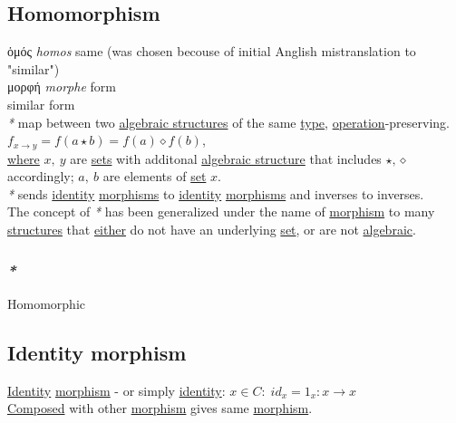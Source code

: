 \documentclass[a4paper,14pt,oneside]{book}
\begin{document}
{\subsection{\label{org203620e}Homomorphism}
\label{sec:orga778f43}
ὁμός \emph{homos} same (was chosen becouse of initial Anglish mistranslation to "similar")\\
μορφή \emph{morphe} form\\
similar form\\

\emph{*} map between two \hyperref[org344f79b]{algebraic structures} of the same \hyperref[orga9ca243]{type}, \hyperref[org4cee8d5]{operation}-preserving.\\

\(f_{x \to y} = f(a \star b) = f(a) \diamond f(b)\),\\
\hyperref[org5b6b021]{where} \(x,\ y\) are \hyperref[org732f054]{sets} with additonal \hyperref[org57a3d22]{algebraic structure} that includes \(\star, \diamond\) accordingly; \(a,\ b\) are elements of \hyperref[org0726f94]{set} \(x\).\\

\emph{*} sends \hyperref[org4f76d7c]{identity} \hyperref[org43d1069]{morphisms} to \hyperref[org4f76d7c]{identity} \hyperref[org43d1069]{morphisms} and inverses to inverses.\\

The concept of \emph{*} has been generalized under the name of \hyperref[orgc09f1a4]{morphism} to many \hyperref[org29bb033]{structures} that \hyperref[org25321ee]{either} do not have an underlying \hyperref[org0726f94]{set}, or are not \hyperref[org312c3a4]{algebraic}.\\

\subsubsection{\emph{*}}
\label{sec:org9956372}

\label{org6f798fd}Homomorphic\\

\subsection{\label{org49d6a99}Identity morphism}
\label{sec:org2437ff5}
\hyperref[org4f76d7c]{Identity} \hyperref[orgc09f1a4]{morphism} - or simply \hyperref[org4f76d7c]{identity}: \(x \in C : \; id_{x}=1_{x} : x \to x\)\\
\hyperref[org4c2168c]{Composed} with other \hyperref[orgc09f1a4]{morphism} gives same \hyperref[orgc09f1a4]{morphism}.\\

}
\end{document}

